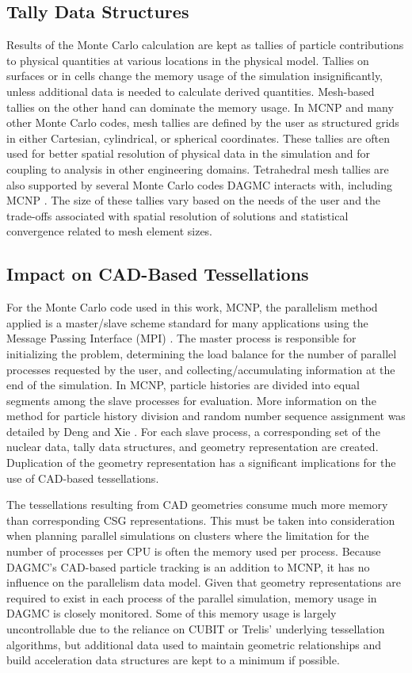 \subsection{Tally Data Structures}

Results of the Monte Carlo calculation are kept as tallies of particle
contributions to physical quantities at various locations in the physical
model. Tallies on surfaces or in cells change the memory usage of the simulation
insignificantly, unless additional data is needed to calculate derived
quantities. Mesh-based tallies on the other hand can dominate the memory
usage. In MCNP and many other Monte Carlo codes, mesh tallies are defined by the
user as structured grids in either Cartesian, cylindrical, or spherical
coordinates. These tallies are often used for better spatial resolution of
physical data in the simulation and for coupling to analysis in other
engineering domains. Tetrahedral mesh tallies are also supported by several
Monte Carlo codes DAGMC interacts with, including MCNP
\cite{LANL_MCNP5_VOLIII}. The size of these tallies vary based on the needs of
the user and the trade-offs associated with spatial resolution of solutions and
statistical convergence related to mesh element sizes.

\subsection{Impact on CAD-Based Tessellations}

For the Monte Carlo code used in this work, MCNP, the parallelism method applied
is a master/slave scheme standard for many applications using the Message
Passing Interface (MPI) \cite{Forum_1994}. The master process is responsible for
initializing the problem, determining the load balance for the number of
parallel processes requested by the user, and collecting/accumulating
information at the end of the simulation. In MCNP, particle histories are
divided into equal segments among the slave processes for evaluation. More
information on the method for particle history division and random number
sequence assignment was detailed by Deng and Xie \cite{Deng_1999}. For each
slave process, a corresponding set of the nuclear data, tally data structures,
and geometry representation are created. Duplication of the geometry
representation has a significant implications for the use of CAD-based
tessellations.

The tessellations resulting from CAD geometries consume much more memory than
corresponding CSG representations. This must be taken into consideration when
planning parallel simulations on clusters where the limitation for the number of
processes per CPU is often the memory used per process. Because DAGMC's
CAD-based particle tracking is an addition to MCNP, it has no influence on the
parallelism data model. Given that geometry representations are required to
exist in each process of the parallel simulation, memory usage in DAGMC is
closely monitored. Some of this memory usage is largely uncontrollable due to
the reliance on CUBIT or Trelis' underlying tessellation algorithms, but
additional data used to maintain geometric relationships and build acceleration
data structures are kept to a minimum if possible.

